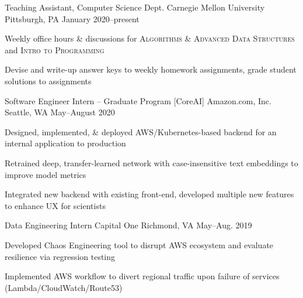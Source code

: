 \documentclass[10pt, letterpaper]{awesome-cv}
\begin{document}
\begin{cventries}

    \cventry
        {Teaching Assistant, Computer Science Dept.}
        {Carnegie Mellon University}
        {Pittsburgh, PA}
        {January 2020--present}
        {\begin{cvitems} 
            \item Weekly office hours \& discussions for {\bodyfont\scshape\color{darktext} Algorithms \& Advanced Data Structures} and {\bodyfont\scshape\color{darktext} Intro to Programming} 
            \item Devise and write-up answer keys to weekly homework assignments, grade student solutions to assignments 
        \end{cvitems}}   
        
        \cventry
        {Software Engineer Intern -- Graduate Program [CoreAI]}
        {Amazon.com, Inc.}
        {Seattle, WA}
        {May--August 2020}
        {\begin{cvitems} 
            \item Designed, implemented, \& deployed AWS/Kubernetes-based backend for an internal application to production
            \item Retrained deep, transfer-learned network with case-insensitive text embeddings to improve model metrics
            \item Integrated new backend with existing front-end, developed multiple new features to enhance UX for scientists
        \end{cvitems}}
        
    
    \cventry
        {Data Engineering Intern}
        {Capital One}
        {Richmond, VA}
        {May--Aug. 2019}
        {\begin{cvitems} 
            \item Developed Chaos Engineering tool to disrupt AWS ecosystem and evaluate resilience via regression testing 
            \item Implemented AWS workflow to divert regional traffic upon failure of services (Lambda/CloudWatch/Route53)
        \end{cvitems}}
        

\end{cventries}
\end{document}
